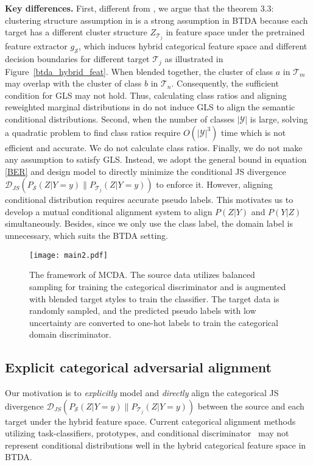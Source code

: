 \documentclass[letterpaper]{article} \usepackage{aaai23}  \usepackage{times}  \usepackage{helvet}  \usepackage{courier}  \usepackage[hyphens]{url}  \usepackage{graphicx} \urlstyle{rm} \def\UrlFont{\rm}  \usepackage{natbib}  \usepackage{caption} \frenchspacing  \setlength{\pdfpagewidth}{8.5in}  \setlength{\pdfpageheight}{11in}
\begin{document}
\noindent\textbf{Key differences.} First, different from \cite{tachet2020domain}, we argue that the theorem 3.3: clustering structure assumption in \cite{tachet2020domain} is a strong assumption in BTDA because each target has a different cluster structure $Z_{\mathcal{T}_j}$ in feature space under the pretrained feature extractor $g_{\mathcal{S}}$, which induces hybrid categorical feature space and different decision boundaries for different target $\mathcal{T}_j$ as illustrated in Figure~\ref{btda_hybrid_feat}. When blended together, the cluster of class $a$ in $\mathcal{T}_m$ may overlap with the cluster of class $b$ in $\mathcal{T}_n$. Consequently, the sufficient condition for GLS may not hold. Thus, calculating class ratios and aligning reweighted marginal distributions in \cite{tachet2020domain} do not induce GLS to align the semantic conditional distributions. Second, when the number of classes $ | \mathcal{Y} |$ is large, solving a quadratic problem to find class ratios require $O(|\mathcal{Y}|^3)$ time which is not efficient and accurate. We do not calculate class ratios. Finally, we do not make any assumption to satisfy GLS. Instead, we adopt the general bound in equation \ref{BER} and design model to directly minimize the conditional JS divergence $\mathcal{D}_{JS}(P_{\mathcal{S}}(Z | Y=y) \| P_{\mathcal{T}_j}(Z | Y=y)) $ to enforce it. However, aligning conditional distribution requires accurate pseudo labels. This motivates us to develop a mutual conditional alignment system to align $P(Z|Y)$ and $P(Y|Z)$ simultaneously. Besides, since we only use the class label, the domain label is unnecessary, which suits the BTDA setting. 

\begin{figure*}[t] \centering \texttt{[image: main2.pdf]} \caption{The framework of MCDA. The source data utilizes balanced sampling for training the categorical discriminator and is augmented with blended target styles to train the classifier. The target data is randomly sampled, and the predicted pseudo labels with low uncertainty are converted to one-hot labels to train the categorical domain discriminator.} \label{main_fig} \end{figure*}



\subsection{Explicit categorical adversarial alignment}
Our motivation is to \textit{explicitly} model and \textit{directly} align the categorical JS divergence $\mathcal{D}_{JS}(P_{\mathcal{S}}(Z|Y=y) \| P_{\mathcal{T}_j}(Z|Y=y)) $ between the source and each target under the hybrid feature space. Current categorical alignment methods utilizing task-classifiers, prototypes, and conditional discriminator~\cite{zhang2019bridging,saito2019semi,long2018conditional} may not represent conditional distributions well in the hybrid categorical feature space in BTDA.
\end{document}
